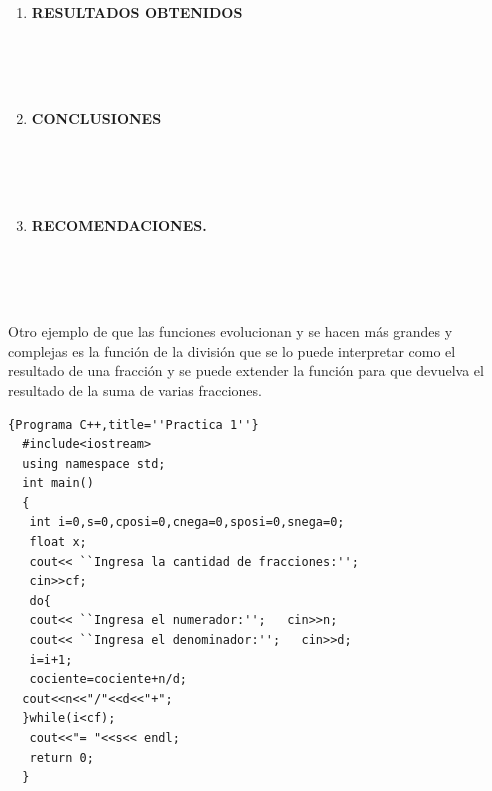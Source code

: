 \documentclass[a4paper,12pt,spanish]{article}
\begin{document}
\begin{enumerate}
  \item \textbf{RESULTADOS OBTENIDOS}

    \hrulefill \\
    
    \hrulefill \\
    
    \hrulefill \\
    
  \item \textbf{CONCLUSIONES}

    \hrulefill \\
    
    \hrulefill \\
    
    \hrulefill \\

 \item \textbf{RECOMENDACIONES.}

    \hrulefill \\
    
    \hrulefill \\
    
    \hrulefill \\

    
  \end{enumerate}




     Otro ejemplo de que las funciones evolucionan y se hacen más grandes y complejas es la función de la división que se lo puede interpretar como el resultado de una fracción y se puede extender la función para que devuelva el resultado de la suma de varias fracciones.

    \begin{lstlisting}[frame=trBL,caption={\textbf{sumafracciones()}}]{Programa C++,title=''Practica 1''}
  #include<iostream>
  using namespace std;
  int main()
  {
   int i=0,s=0,cposi=0,cnega=0,sposi=0,snega=0;
   float x;
   cout<< ``Ingresa la cantidad de fracciones:'';
   cin>>cf;
   do{
   cout<< ``Ingresa el numerador:'';   cin>>n;
   cout<< ``Ingresa el denominador:'';   cin>>d;
   i=i+1;
   cociente=cociente+n/d;
  cout<<n<<"/"<<d<<"+";
  }while(i<cf);
   cout<<"= "<<s<< endl;
   return 0;
  }
\end{lstlisting}
\end{document}
